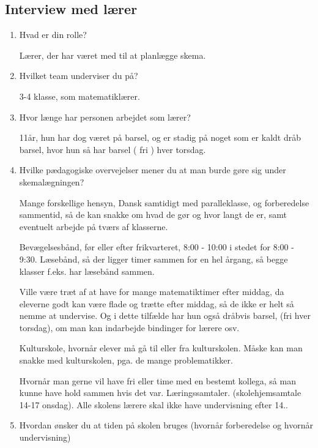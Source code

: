 \subsection{Interview med lærer}
\label{InterviewLaerer}
\begin{enumerate}
	\item Hvad er din rolle?
    
    Lærer, der har været med til at planlægge skema.
   
   
    \item Hvilket team underviser du på?
	    
	3-4 klasse, som matematiklærer.
    
    
    \item Hvor længe har personen arbejdet som lærer?
	    
	11år, hun har dog været på barsel, og er stadig på noget som er kaldt dråb barsel, hvor hun så har barsel ( fri ) hver torsdag.
    
    
    \item Hvilke pædagogiske overvejelser mener du at man burde gøre sig under skemalægningen?
		
	Mange forskellige hensyn, Dansk samtidigt med paralleklasse, og forberedelse sammentid, så de kan snakke om hvad de gør og hvor langt de er, samt eventuelt arbejde på tværs af klasserne.
	
	Bevægelsesbånd, før eller efter frikvarteret, 8:00 - 10:00 i stedet for 8:00 - 9:30. Læsebånd, så der ligger timer sammen for en hel årgang, så begge klasser f.eks. har læsebånd sammen.
	
	Ville være træt af at have for mange matematiktimer efter middag, da eleverne godt kan være flade og trætte efter middag, så de ikke er helt så nemme at undervise. Og i dette tilfælde har hun også dråbvis barsel, (fri hver torsdag), om man kan indarbejde bindinger for lærere osv. 
		
	Kulturskole, hvornår elever må gå til eller fra kulturskolen. Måske kan man snakke med kulturskolen, pga. de mange problematikker.
	
	Hvornår man gerne vil have fri eller time med en bestemt kollega, så man kunne have hold sammen hvis det var. Læringssamtaler. (skolehjemsamtale 14-17 onsdag). Alle skolens lærere skal ikke have undervisning efter 14.. 
		
    
    \item Hvordan ønsker du at tiden på skolen bruges (hvornår forberedelse og hvornår undervisning)
    

\end{enumerate}
